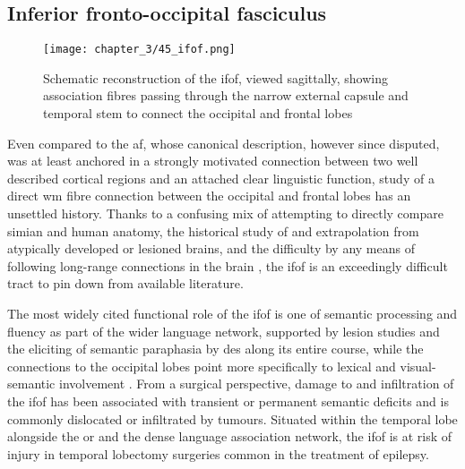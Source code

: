 \subsection{Inferior fronto-occipital fasciculus}


\begin{SCfigure}[][hbt!]
  \texttt{[image: chapter\_3/45\_ifof.png]}
  \caption{Schematic reconstruction of the \gls{ifof}, viewed sagittally, showing association fibres passing through the narrow external capsule and temporal stem to connect the occipital and frontal lobes}
  \label{fig:ifof}
\end{SCfigure}

Even compared to the \gls{af}, whose canonical description, however since disputed, was at least anchored in a strongly motivated connection between two well described cortical regions and an attached clear linguistic function, study of a direct \gls{wm} fibre connection between the occipital and frontal lobes has an unsettled history\autocite{Forkel2014a}.
Thanks to a confusing mix of attempting to directly compare simian and human anatomy\autocite{Schmahmann2007,ThiebautdeSchotten2012,Mandonnet2018,Sarubbo2019}, the historical study of and extrapolation from atypically developed or lesioned brains\autocite{Schmahmann2007,Forkel2014a}, and the difficulty by any means of following long-range connections in the brain
\autocite{Martino2010}, the \gls{ifof} is an exceedingly difficult tract to pin down from available literature\autocite{Sarubbo2019,Weiller2021}.

The most widely cited functional role of the \gls{ifof} is one of semantic processing and fluency as part of the wider language network, supported by lesion studies\autocite{Ille2018b,Almairac2015} and the eliciting of semantic paraphasia by \gls{des} along its entire course\autocite{Duffau2013a,Herbet2017,Voets2017,Vigren2020a}, while the connections to the occipital lobes point more specifically to lexical and visual-semantic involvement
\autocite{Martino2010,Rollans2017,Rollans2018}.
From a surgical perspective, damage to and infiltration of the \gls{ifof} has been associated with transient or permanent semantic deficits and is commonly dislocated or infiltrated by tumours\autocite{Almairac2015,Voets2017,Altieri2019,Binding2023}.
Situated within the temporal lobe alongside the \gls{or} and the dense language association network, the \gls{ifof} is at risk of injury in temporal lobectomy surgeries common in the treatment of epilepsy\autocite{Baran2020,Shah2022,Binding2023}.

